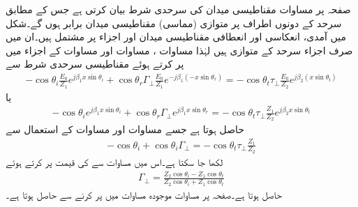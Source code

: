 صفحہ  پر  مساوات  مقناطیسی میدان کی سرحدی شرط بیان کرتی ہے جس کے مطابق سرحد کے دونوں اطراف پر متوازی  (مماسی)  مقناطیسی میدان برابر ہوں گے۔شکل  میں آمدی، انعکاسی اور انعطافی مقناطیسی میدان  اور  اجزاء  پر مشتمل ہیں۔ان میں صرف  اجزاء سرحد کے متوازی ہیں لہٰذا مساوات ، مساوات  اور مساوات  کے  اجزاء میں  پر کرتے ہوئے مقناطیسی سرحدی شرط سے  
\begin{align*}
 -\cos \theta_i \frac{E_0}{Z_1} e^{j\beta_1 x\sin \theta_i }+\cos \theta_r \Gamma_{\perp} \frac{ E_0}{Z_1} e^{-j \beta_1 (-x \sin \theta_r)}=-\cos \theta_t  \tau_{\perp} \frac{E_0}{Z_2} e^{j \beta_2 (x \sin \theta_t)}
\end{align*}
یا
\begin{align*}
 -\cos \theta_i  e^{j\beta_1 x\sin \theta_i }+\cos \theta_r \Gamma_{\perp}  e^{j \beta_1 x \sin \theta_r}=-\cos \theta_t  \tau_{\perp} \frac{Z_1}{Z_2} e^{j \beta_2  x \sin \theta_t}
\end{align*}
حاصل ہوتا ہے جسے مساوات  اور مساوات  کے استعمال سے
\begin{align*}
 -\cos \theta_i +\cos \theta_i \Gamma_{\perp} =-\cos \theta_t  \tau_{\perp} \frac{Z_1}{Z_2}
\end{align*}
لکھا جا سکتا ہے۔اس میں مساوات  سے  کی قیمت پر کرتے ہوئے
\begin{align}\label{مساوات_ترچھی_شرح_انعکاس_عمودی_الف}
\Gamma_{\perp}=\frac{Z_2 \cos \theta_i -Z_1 \cos \theta_t}{Z_2 \cos \theta_i +Z_1 \cos \theta_t}
\end{align}
حاصل ہوتا ہے۔صفحہ  پر مساوات  موجودہ مساوات میں  پر کرنے سے حاصل ہوتا ہے۔

